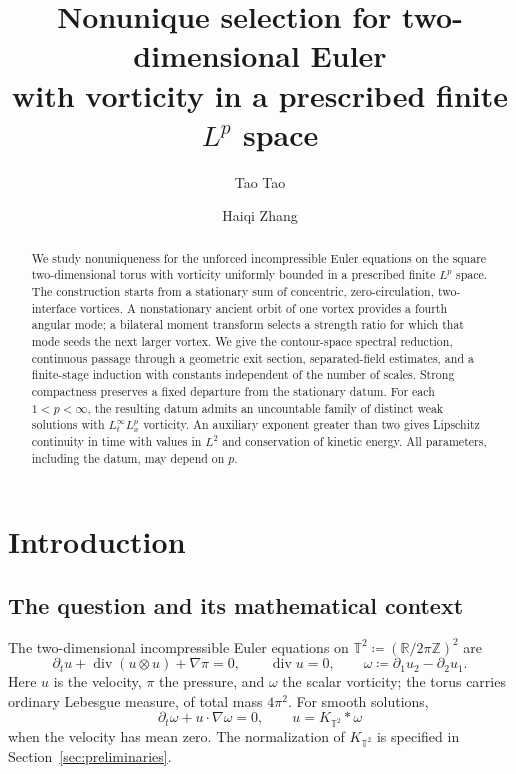 \documentclass[11pt]{amsart}
\title[Nonunique selection for two-dimensional Euler]{Nonunique selection for two-dimensional Euler\\
with vorticity in a prescribed finite $L^p$ space}
\author[T.~Tao]{Tao Tao}
\author[H.~Zhang]{Haiqi Zhang}
\date{}
\theoremstyle{remark}
\numberwithin{equation}{section}
\newcommand{\R}{\mathbb R}
\newcommand{\T}{\mathbb T}
\begin{document}
\begin{abstract}
We study nonuniqueness for the unforced incompressible Euler equations
on the square two-dimensional torus with vorticity uniformly bounded in
a prescribed finite $L^p$ space. The construction starts from a stationary
sum of concentric, zero-circulation, two-interface vortices. A nonstationary
ancient orbit of one vortex provides a fourth angular mode; a bilateral
moment transform selects a strength ratio for which that mode seeds the
next larger vortex. We give the contour-space spectral reduction,
continuous passage through a geometric exit section, separated-field
estimates, and a finite-stage induction with constants independent of
the number of scales. Strong compactness preserves a fixed departure
from the stationary datum. For each $1<p<\infty$, the resulting datum
admits an uncountable family of distinct weak solutions with
$L^\infty_tL^p_x$ vorticity. An auxiliary exponent greater than two gives
Lipschitz continuity in time with values in $L^2$ and conservation of
kinetic energy. All parameters, including the datum, may depend on $p$.
\end{abstract}

\maketitle

\tableofcontents

\section{Introduction}\label{sec:introduction}
\subsection{The question and its mathematical context}
The two-dimensional incompressible Euler equations on
$\T^2\coloneqq(\R/2\pi\mathbb Z)^2$ are
\begin{equation}\label{intro:euler}
 \partial_tu+\operatorname{div}(u\otimes u)+\nabla\pi=0,
 \qquad \operatorname{div}u=0,
 \qquad \omega\coloneqq\partial_1u_2-\partial_2u_1.
\end{equation}
Here $u$ is the velocity, $\pi$ the pressure, and $\omega$ the scalar
vorticity; the torus carries ordinary Lebesgue measure, of total mass
$4\pi^2$. For smooth solutions,
\begin{equation}\label{intro:transport}
 \partial_t\omega+u\cdot\nabla\omega=0,
 \qquad u=K_{\T^2}*\omega
\end{equation}
when the velocity has mean zero. The normalization of $K_{\T^2}$ is
specified in Section~\ref{sec:preliminaries}.
\end{document}
